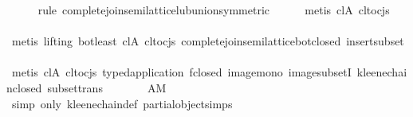 \begin{isabellebody}
\ \ \ \ \isamarkupfalse%
\ {}rule\ complete{}join{}semilattice{}lub{}union{}symmetric{}{}\isanewline
\ \ \ \ \isamarkupfalse%
\ {}metis\ cl{}A\ cl{}to{}cjs{}\isanewline
\ \ \ \ \isamarkupfalse%
\ {}metis\ {}lifting{}\ bot{}least\ cl{}A\ cl{}to{}cjs\ complete{}join{}semilattice{}bot{}closed\ insert{}subset{}\isanewline
\ \ \ \ \isamarkupfalse%
\ {}metis\ cl{}A\ cl{}to{}cjs\ typed{}application\ f{}closed\ image{}mono\ image{}subsetI\ kleene{}chain{}closed\ subset{}trans{}\isanewline
\ \ \isamarkupfalse%
\ \isamarkupfalse%
\ {}{}{}{}\ {}\ {}\isactrlbsub AM{}\isanewline
\ \ \ \ \isamarkupfalse%
\ {}simp\ only{}\ kleene{}chain{}def\ partial{}object{}simps{}{}{}{}\isanewline

\end{isabellebody}
